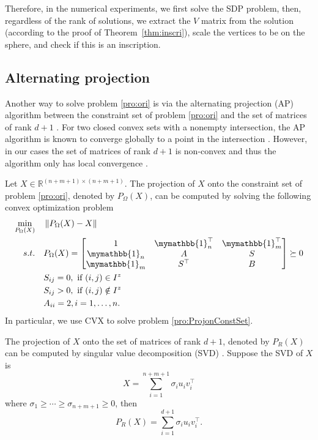 \documentclass[smallextended, envcountsame]{svjour3}
\begin{document}
    Therefore, in the numerical experiments, we first solve the SDP problem, then, regardless of the rank of solutions, we extract the $V$ matrix from the solution (according to the proof of Theorem~\ref{thm:inscri}), scale the vertices to be on the sphere, and check if this is an inscription.
    

\subsection{Alternating projection}
    Another way to solve problem \eqref{pro:ori} is via the alternating projection (AP) algorithm between the constraint set of problem \eqref{pro:ori} and the set of matrices of rank $d+1$ \cite{fazel2004rank}.  For two closed convex sets with a nonempty intersection, the AP algorithm is known to converge globally to a point in the intersection \cite{bauschke2023introduction}.  However, in our cases the set of matrices of rank $d+1$ is non-convex and thus the algorithm only has local convergence \cite{bauschke2013restrictedb,bauschke2013restricteda,lewis2009local,noll2016local}.

    Let $X\in\mathbb{R}^{(n+m+1)\times(n+m+1)}$.  The projection of $X$ onto the constraint set of problem \eqref{pro:ori}, denoted by $P_\Omega(X)$, can be computed by solving the following convex optimization problem
    \begin{align}\label{pro:ProjonConstSet}
        \begin{split}
            \min_{P_\Omega(X)}~~~&\left\|P_\Omega(X)-X\right\|\\
            s.t.~~~& P_\Omega(X) = 
            \begin{bmatrix}
                1 & \mymathbb{1}_n^\top & \mymathbb{1}_m^\top\\
                \mymathbb{1}_n & A & S\\
                \mymathbb{1}_m & S^\top & B
            \end{bmatrix} \succeq 0\\
            & S_{ij} = 0,~\text{if}~(i,j)\in I^z\\
            & S_{ij} > 0,~\text{if}~(i,j)\notin I^z\\
            & A_{ii} = 2, i = 1,\ldots,n.
        \end{split}
    \end{align}
    In particular, we use CVX \cite{grant2008graph,grant2014cvx} to solve problem \eqref{pro:ProjonConstSet}.
    
    The projection of $X$ onto the set of matrices of rank $d+1$, denoted by $P_R(X)$ can be computed by singular value decomposition (SVD) \cite{eckart1936approximation}.  Suppose the SVD of $X$ is $$X=\sum\limits_{i=1}^{n+m+1}\sigma_iu_iv_i^\top$$ where $\sigma_1\ge\cdots\ge\sigma_{n+m+1}\ge 0$, then $$P_R(X)=\sum\limits_{i=1}^{d+1}\sigma_iu_iv_i^\top.$$
\end{document}
